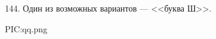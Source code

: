 144. Один из возможных вариантов --- <<буква Ш>>.
\begin{center}
{{PIC:qq.png}}
\end{center}\newpage\noindent
